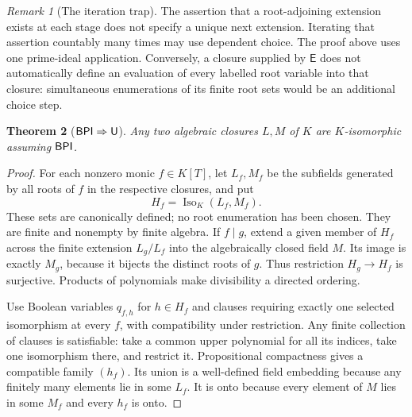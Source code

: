 \documentclass[11pt,a4paper]{article}
\newtheorem{theorem}{Theorem}[section]
\theoremstyle{definition}\newtheorem{definition}[theorem]{Definition}
\theoremstyle{remark}\newtheorem{remark}[theorem]{Remark}
\newcommand{\E}{\mathsf E}\newcommand{\U}{\mathsf U}
\DeclareMathOperator{\Iso}{Iso}\DeclareMathOperator{\Aut}{Aut}
\begin{document}
\begin{remark}[The iteration trap]
The assertion that a root-adjoining extension exists at each stage does not specify a unique next extension. Iterating that assertion countably many times may use dependent choice. The proof above uses one prime-ideal application. Conversely, a closure supplied by $\E$ does not automatically define an evaluation of every labelled root variable into that closure: simultaneous enumerations of its finite root sets would be an additional choice step.
\end{remark}

\begin{theorem}[$\BPI\Rightarrow\U$]\label{thm:bpiu}
Any two algebraic closures $L,M$ of $K$ are $K$-isomorphic assuming $\mathsf{BPI}$.
\end{theorem}
\begin{proof}
For each nonzero monic $f\in K[T]$, let $L_f,M_f$ be the subfields generated by all roots of $f$ in the respective closures, and put
\[
H_f=\Iso_K(L_f,M_f).
\]
These sets are canonically defined; no root enumeration has been chosen. They are finite and nonempty by finite algebra. If $f\mid g$, extend a given member of $H_f$ across the finite extension $L_g/L_f$ into the algebraically closed field $M$. Its image is exactly $M_g$, because it bijects the distinct roots of $g$. Thus restriction $H_g\to H_f$ is surjective. Products of polynomials make divisibility a directed ordering.

Use Boolean variables $q_{f,h}$ for $h\in H_f$ and clauses requiring exactly one selected isomorphism at every $f$, with compatibility under restriction. Any finite collection of clauses is satisfiable: take a common upper polynomial for all its indices, take one isomorphism there, and restrict it. Propositional compactness gives a compatible family $(h_f)$. Its union is a well-defined field embedding because any finitely many elements lie in some $L_f$. It is onto because every element of $M$ lies in some $M_f$ and every $h_f$ is onto.
\end{proof}
\end{document}
